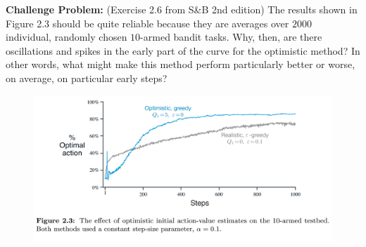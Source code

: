 
\textbf{Challenge Problem:} (Exercise 2.6 from S\&B 2nd edition) The results shown in Figure 2.3 should be quite reliable
because they are averages over $2000$ individual, randomly chosen $10$-armed bandit tasks.
Why, then, are there oscillations and spikes in the early part of the curve for the optimistic
method? In other words, what might make this method perform particularly better or
worse, on average, on particular early steps?
\begin{figure}
\center
\includegraphics[width=0.9\linewidth]{figures/figure_2dot3.png}
\end{figure}
\smallspace

